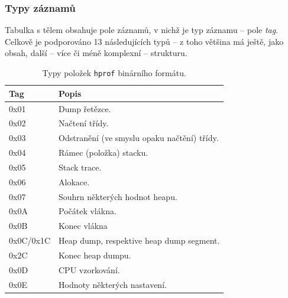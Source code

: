 \subsubsection{Typy záznamů}
Tabulka s tělem obsahuje pole záznamů, v nichž je typ záznamu -- pole \textit{tag}. Celkově je podporováno 13 následujících typů -- z toho většina má ještě, jako obsah, další -- více či méně komplexní -- strukturu.
\begin{table}[ht!]
    \begin{tabularx}{\textwidth}{|l|X|}
        \hline
    \textbf{Tag} & \textbf{Popis} \\ \hline \hline
    0x01 & Dump řetězce. \\
    0x02 & Načtení třídy. \\
    0x03 & Odstranění (ve smyslu opaku načtění) třídy. \\
    0x04 & Rámec (položka) stacku. \\
    0x05 & Stack trace. \\
    0x06 & Alokace. \\
    0x07 & Souhrn některých hodnot heapu. \\
    0x0A & Počátek vlákna. \\
    0x0B & Konec vlákna \\
    0x0C/0x1C & Heap dump, respektive heap dump segment. \\
    0x2C & Konec heap dumpu. \\
    0x0D & CPU vzorkování. \\
    0x0E & Hodnoty některých nastavení. \\ \hline                                                                   
    \end{tabularx}
    \caption{Typy položek \texttt{hprof} binárního formátu.}
    \label{table-hprof-types}
\end{table}

